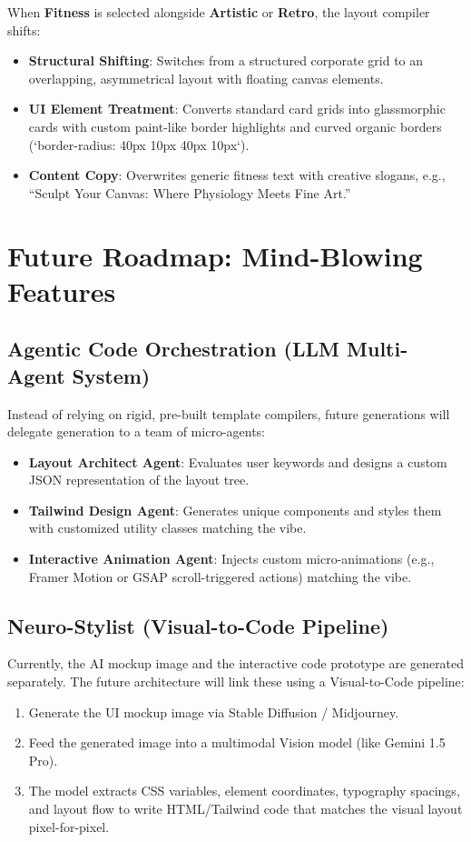 \documentclass[11pt,a4paper]{article}
\begin{document}
When \textbf{Fitness} is selected alongside \textbf{Artistic} or \textbf{Retro}, the layout compiler shifts:
\begin{itemize}
    \item \textbf{Structural Shifting}: Switches from a structured corporate grid to an overlapping, asymmetrical layout with floating canvas elements.
    \item \textbf{UI Element Treatment}: Converts standard card grids into glassmorphic cards with custom paint-like border highlights and curved organic borders (`border-radius: 40px 10px 40px 10px`).
    \item \textbf{Content Copy}: Overwrites generic fitness text with creative slogans, e.g., ``Sculpt Your Canvas: Where Physiology Meets Fine Art.''
\end{itemize}

\section{Future Roadmap: Mind-Blowing Features}

\subsection{Agentic Code Orchestration (LLM Multi-Agent System)}
Instead of relying on rigid, pre-built template compilers, future generations will delegate generation to a team of micro-agents:
\begin{itemize}
    \item \textbf{Layout Architect Agent}: Evaluates user keywords and designs a custom JSON representation of the layout tree.
    \item \textbf{Tailwind Design Agent}: Generates unique components and styles them with customized utility classes matching the vibe.
    \item \textbf{Interactive Animation Agent}: Injects custom micro-animations (e.g., Framer Motion or GSAP scroll-triggered actions) matching the vibe.
\end{itemize}

\subsection{Neuro-Stylist (Visual-to-Code Pipeline)}
Currently, the AI mockup image and the interactive code prototype are generated separately. The future architecture will link these using a Visual-to-Code pipeline:
\begin{enumerate}
    \item Generate the UI mockup image via Stable Diffusion / Midjourney.
    \item Feed the generated image into a multimodal Vision model (like Gemini 1.5 Pro).
    \item The model extracts CSS variables, element coordinates, typography spacings, and layout flow to write HTML/Tailwind code that matches the visual layout pixel-for-pixel.
\end{enumerate}
\end{document}
